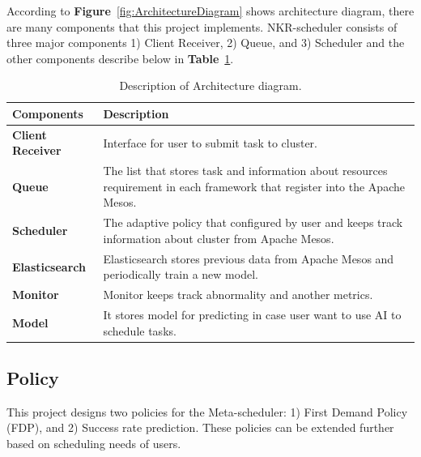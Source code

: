 \documentclass[12pt,oneside,openright,a4paper]{cpe-english-project}
\begin{document}
\hspace{10mm}According to \textbf{Figure}~\ref{fig:ArchitectureDiagram} shows architecture diagram, there are many components that this project implements. NKR-scheduler consists of three major  components 1) Client Receiver, 2) Queue, and 3) Scheduler and the other components describe below in \textbf{Table}~\ref{tbl:ArchitectureDiagramTable}.

\begin{table}[!h]
  \caption{Description of Architecture diagram.}\label{tbl:ArchitectureDiagramTable}
  \begin{tabular}{@{}|p{}|p{}|}
    \hline
    \textbf{Components} & \textbf{Description}\\
    \hline
    \textbf{Client Receiver} & Interface for user to submit task to cluster.\\
    \hline
    \textbf{Queue} & The list that stores task and information about resources requirement in each framework that register into the Apache Mesos.\\
    \hline
    \textbf{Scheduler} & The adaptive policy that configured by user and keeps track information about cluster from Apache Mesos.\\
    \hline
    \textbf{Elasticsearch} & Elasticsearch stores previous data from Apache Mesos and periodically train a new model.\\
    \hline
    \textbf{Monitor} & Monitor keeps track abnormality and another metrics.\\
    \hline
    \textbf{Model} & It stores model for predicting in case user want to use AI to schedule tasks.\\
    \hline
  \end{tabular}
\end{table}

\newpage
\subsection{Policy}  
\hspace{10mm}This project designs two policies for the Meta-scheduler: 1) First Demand Policy (FDP), and 2) Success rate prediction. These policies can be extended further based on scheduling needs of users. 
\end{document}

